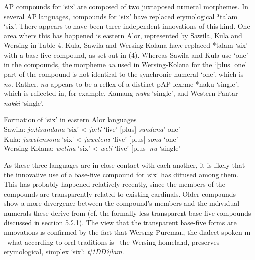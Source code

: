 {AP compounds for `six' are composed of two juxtaposed numeral morphemes. In several AP languages, compounds for `six' have replaced etymological *talam `six'. There appears to have been three independent innovations of this kind. One area where this has happened is eastern Alor, represented by Sawila, Kula and Wersing in Table 4. Kula, Sawila and Wersing-Kolana have replaced *talam `six' with a base-five compound, as set out in (4). Whereas Sawila and Kula use `one' in the compounds, the morpheme \textit{nu}\textit{{\ng}} used in Wersing-Kolana for the `[plus] one' part of the compound is not identical to the synchronic numeral `one', which is \textit{no}. Rather, \textit{nu}\textit{{\ng}} appears to be a reflex of a distinct pAP lexeme *naku{\ng} `single', which is reflected in, for example, Kamang \textit{nuku}\textit{{\ng}} `single', and Western Pantar \textit{nakki}\textit{{\ng}} `single'.



\ea%
\label{ex:4}
Formation of `six' in eastern Alor languages\\
\glll Sawila:      \textit{jo:ti}\textit{{\ng}}\textit{sundana}\textbf{}   `six'   {\textless} \textit{jo:ti}\textit{{\ng}} `five'   [plus] \textit{sundana}' one'\\
   Kula:       \textit{jawatensona}\textbf{}   `six'   {\textless} \textit{jawetena} `five' [plus] \textit{sona} `one'    \\
   Wersing-Kolana:   \textit{weti}\textit{{\ng}}\textit{nu}\textit{{\ng}}  `six'   {\textless} \textit{weti}\textit{{\ng}} `five'   [plus] \textit{nu}\textit{{\ng}} `single'    \\
\z







As these three languages are in close contact with each another, it is likely that the innovative use of a base-five compound for `six' has diffused among them. This has probably happened relatively recently, since the members of the compounds are transparently related to existing cardinals. Older compounds show a more divergence between the compound's members and the individual numerals these derive from (cf. the formally less transparent base-five compounds discussed in section 5.2.1). The view that the transparent base-five forms are innovations is confirmed by the fact that Wersing-Pureman, the dialect spoken in --what according to oral traditions is-- the Wersing homeland, preserves etymological, simplex `six': \textit{t}\textit{[1DD?]}\textit{lam}.

}
